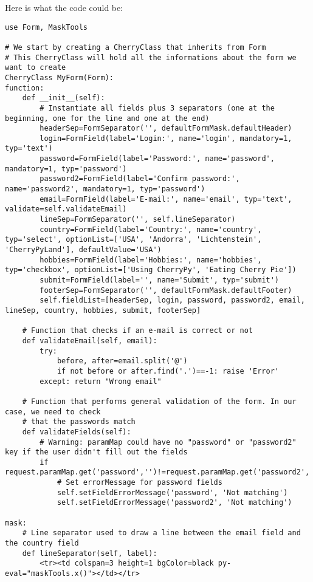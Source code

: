 Here is what the code could be:
\begin{verbatim}
use Form, MaskTools

# We start by creating a CherryClass that inherits from Form
# This CherryClass will hold all the informations about the form we want to create
CherryClass MyForm(Form):
function:
    def __init__(self):
        # Instantiate all fields plus 3 separators (one at the beginning, one for the line and one at the end)
        headerSep=FormSeparator('', defaultFormMask.defaultHeader)
        login=FormField(label='Login:', name='login', mandatory=1, typ='text')
        password=FormField(label='Password:', name='password', mandatory=1, typ='password')
        password2=FormField(label='Confirm password:', name='password2', mandatory=1, typ='password')
        email=FormField(label='E-mail:', name='email', typ='text', validate=self.validateEmail)
        lineSep=FormSeparator('', self.lineSeparator)
        country=FormField(label='Country:', name='country', typ='select', optionList=['USA', 'Andorra', 'Lichtenstein', 'CherryPyLand'], defaultValue='USA')
        hobbies=FormField(label='Hobbies:', name='hobbies', typ='checkbox', optionList=['Using CherryPy', 'Eating Cherry Pie'])
        submit=FormField(label='', name='Submit', typ='submit')
        footerSep=FormSeparator('', defaultFormMask.defaultFooter)
        self.fieldList=[headerSep, login, password, password2, email, lineSep, country, hobbies, submit, footerSep]

    # Function that checks if an e-mail is correct or not
    def validateEmail(self, email):
        try:
            before, after=email.split('@')
            if not before or after.find('.')==-1: raise 'Error'
        except: return "Wrong email"

    # Function that performs general validation of the form. In our case, we need to check
    # that the passwords match
    def validateFields(self):
        # Warning: paramMap could have no "password" or "password2" key if the user didn't fill out the fields
        if request.paramMap.get('password','')!=request.paramMap.get('password2',''):
            # Set errorMessage for password fields
            self.setFieldErrorMessage('password', 'Not matching')
            self.setFieldErrorMessage('password2', 'Not matching')

mask:
    # Line separator used to draw a line between the email field and the country field
    def lineSeparator(self, label):
        <tr><td colspan=3 height=1 bgColor=black py-eval="maskTools.x()"></td></tr>


\end{verbatim}
